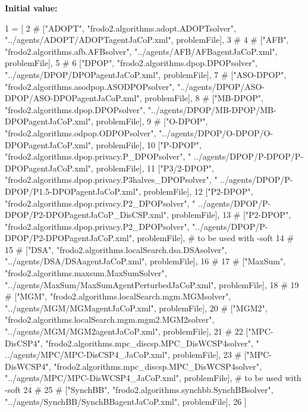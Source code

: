 {\bfseries Initial value\+:}
\begin{DoxyCode}
1 =  [
2 \textcolor{comment}{#       ["ADOPT", "frodo2.algorithms.adopt.ADOPTsolver", "../agents/ADOPT/ADOPTagentJaCoP.xml",
       problemFile], }
3 \textcolor{comment}{# }
4 \textcolor{comment}{#       ["AFB", "frodo2.algorithms.afb.AFBsolver", "../agents/AFB/AFBagentJaCoP.xml", problemFile], }
5 \textcolor{comment}{# }
6         [\textcolor{stringliteral}{"DPOP"}, \textcolor{stringliteral}{"frodo2.algorithms.dpop.DPOPsolver"}, \textcolor{stringliteral}{"../agents/DPOP/DPOPagentJaCoP.xml"}, problemFile], 
7 \textcolor{comment}{#       ["ASO-DPOP", "frodo2.algorithms.asodpop.ASODPOPsolver",
       "../agents/DPOP/ASO-DPOP/ASO-DPOPagentJaCoP.xml", problemFile], }
8 \textcolor{comment}{#       ["MB-DPOP", "frodo2.algorithms.dpop.DPOPsolver", "../agents/DPOP/MB-DPOP/MB-DPOPagentJaCoP.xml",
       problemFile], }
9 \textcolor{comment}{#       ["O-DPOP", "frodo2.algorithms.odpop.ODPOPsolver", "../agents/DPOP/O-DPOP/O-DPOPagentJaCoP.xml",
       problemFile], }
10         [\textcolor{stringliteral}{"P-DPOP"}, \textcolor{stringliteral}{"frodo2.algorithms.dpop.privacy.P\_DPOPsolver"}, \textcolor{stringliteral}{"
      ../agents/DPOP/P-DPOP/P-DPOPagentJaCoP.xml"}, problemFile], 
11         [\textcolor{stringliteral}{"P3/2-DPOP"}, \textcolor{stringliteral}{"frodo2.algorithms.dpop.privacy.P3halves\_DPOPsolver"}, \textcolor{stringliteral}{"
      ../agents/DPOP/P-DPOP/P1.5-DPOPagentJaCoP.xml"}, problemFile], 
12         [\textcolor{stringliteral}{"P2-DPOP"}, \textcolor{stringliteral}{"frodo2.algorithms.dpop.privacy.P2\_DPOPsolver"}, \textcolor{stringliteral}{"
      ../agents/DPOP/P-DPOP/P2-DPOPagentJaCoP\_DisCSP.xml"}, problemFile], 
13 \textcolor{comment}{#       ["P2-DPOP", "frodo2.algorithms.dpop.privacy.P2\_DPOPsolver",
       "../agents/DPOP/P-DPOP/P2-DPOPagentJaCoP.xml", problemFile], # to be used with -soft}
14 \textcolor{comment}{# }
15 \textcolor{comment}{#       ["DSA", "frodo2.algorithms.localSearch.dsa.DSAsolver", "../agents/DSA/DSAagentJaCoP.xml",
       problemFile], }
16 \textcolor{comment}{# }
17 \textcolor{comment}{#       ["MaxSum", "frodo2.algorithms.maxsum.MaxSumSolver",
       "../agents/MaxSum/MaxSumAgentPerturbedJaCoP.xml", problemFile], }
18 \textcolor{comment}{# }
19 \textcolor{comment}{#       ["MGM", "frodo2.algorithms.localSearch.mgm.MGMsolver", "../agents/MGM/MGMagentJaCoP.xml",
       problemFile], }
20 \textcolor{comment}{#       ["MGM2", "frodo2.algorithms.localSearch.mgm.mgm2.MGM2solver", "../agents/MGM/MGM2agentJaCoP.xml",
       problemFile], }
21 \textcolor{comment}{# }
22         [\textcolor{stringliteral}{"MPC-DisCSP4"}, \textcolor{stringliteral}{"frodo2.algorithms.mpc\_discsp.MPC\_DisWCSP4solver"}, \textcolor{stringliteral}{"
      ../agents/MPC/MPC-DisCSP4\_JaCoP.xml"}, problemFile], 
23 \textcolor{comment}{#       ["MPC-DisWCSP4", "frodo2.algorithms.mpc\_discsp.MPC\_DisWCSP4solver",
       "../agents/MPC/MPC-DisWCSP4\_JaCoP.xml", problemFile], # to be used with -soft}
24 \textcolor{comment}{# }
25 \textcolor{comment}{#       ["SynchBB", "frodo2.algorithms.synchbb.SynchBBsolver", "../agents/SynchBB/SynchBBagentJaCoP.xml",
       problemFile], }
26         ]
\end{DoxyCode}
